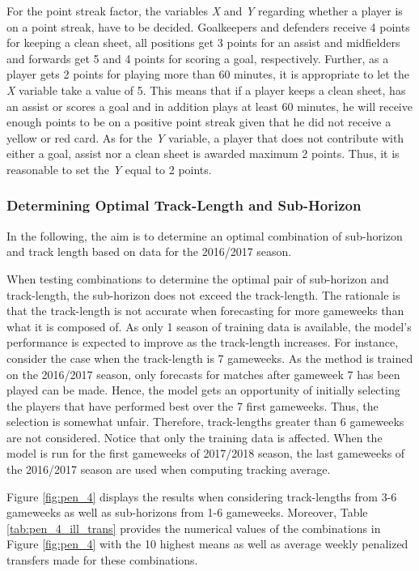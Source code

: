 For the point streak factor, the variables \textit{X} and \textit{Y} regarding whether a player is on a point streak, have to be decided. Goalkeepers and defenders receive 4 points for keeping a clean sheet, all positions get 3 points for an assist and midfielders and forwards get 5 and 4 points for scoring a goal, respectively. Further, as a player gets 2 points for playing more than 60 minutes, it is appropriate to let the \textit{X} variable take a value of 5. This means that if a player keeps a clean sheet, has an assist or scores a goal and in addition plays at least 60 minutes, he will receive enough points to be on a positive point streak given that he did not receive a yellow or red card. As for the \textit{Y} variable, a player that does not contribute with either a goal, assist nor a clean sheet is awarded maximum 2 points. Thus, it is reasonable to set the \textit{Y} equal to 2 points.


\subsubsection{Determining Optimal Track-Length and Sub-Horizon}

In the following, the aim is to determine an optimal combination of sub-horizon and track length based on data for the 2016/2017 season.

\newpar

When testing combinations to determine the optimal pair of sub-horizon and track-length, the sub-horizon does not exceed the track-length. The rationale is that the track-length is not accurate when forecasting for more gameweeks than what it is composed of. As only 1 season of training data is available, the model's performance is expected to improve as the track-length increases. For instance, consider the case when the track-length is 7 gameweeks. As the method is trained on the 2016/2017 season, only forecasts for matches after gameweek 7 has been played can be made. Hence, the model gets an opportunity of initially selecting the players that have performed best over the 7 first gameweeks. Thus, the selection is somewhat unfair. Therefore, track-lengths greater than 6 gameweeks are not considered. Notice that only the training data is affected. When the model is run for the first gameweeks of 2017/2018 season, the last gameweeks of the 2016/2017 season are used when computing tracking average.

\newpar

Figure \ref{fig:pen_4} displays the results when considering track-lengths from 3-6 gameweeks as well as sub-horizons from 1-6 gameweeks.  Moreover, Table \ref{tab:pen_4_ill_trans} provides the numerical values of the combinations in Figure \ref{fig:pen_4} with the 10 highest means as well as average weekly penalized transfers made for these combinations. 


